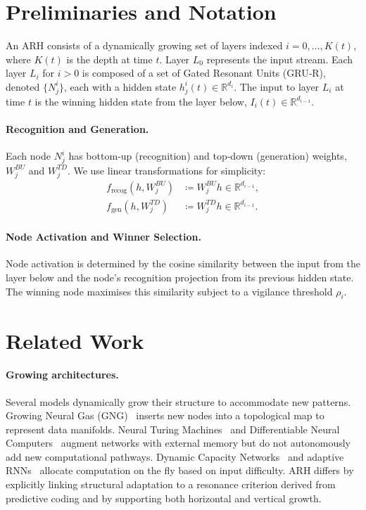 \documentclass{article}
\begin{document}
\section{Preliminaries and Notation}
An ARH consists of a dynamically growing set of layers indexed $i=0,\dots,K(t)$, where $K(t)$ is the depth at time $t$.  Layer $L_0$ represents the input stream.  Each layer $L_i$ for $i>0$ is composed of a set of Gated Resonant Units (GRU‑R), denoted $\{N_j^i\}$, each with a hidden state $h_j^i(t) \in \mathbb{R}^{d_i}$.  The input to layer $L_i$ at time $t$ is the winning hidden state from the layer below, $I_i(t) \in \mathbb{R}^{d_{i-1}}$.

\paragraph{Recognition and Generation.} Each node $N_j^i$ has bottom‑up (recognition) and top‑down (generation) weights, $W_j^{BU}$ and $W_j^{TD}$.  We use linear transformations for simplicity:
\begin{align}
f_{\text{recog}}(h, W_j^{BU}) &\coloneqq W_j^{BU} h \in \mathbb{R}^{d_{i-1}}, \\[-1ex]
f_{\text{gen}}(h, W_j^{TD}) &\coloneqq W_j^{TD} h \in \mathbb{R}^{d_{i-1}}.
\end{align}

\paragraph{Node Activation and Winner Selection.} Node activation is determined by the cosine similarity between the input from the layer below and the node's recognition projection from its previous hidden state.  The winning node maximises this similarity subject to a vigilance threshold $\rho_i$.

\section{Related Work}
\label{sec:related}

\paragraph{Growing architectures.}  Several models dynamically grow their structure to accommodate new patterns.  Growing Neural Gas (GNG) \citep{Fritzke1995} inserts new nodes into a topological map to represent data manifolds.  Neural Turing Machines \citep{Graves2014} and Differentiable Neural Computers \citep{Graves2016} augment networks with external memory but do not autonomously add new computational pathways.  Dynamic Capacity Networks \citep{Algebra2017} and adaptive RNNs \citep{Jernite2017} allocate computation on the fly based on input difficulty.  ARH differs by explicitly linking structural adaptation to a resonance criterion derived from predictive coding and by supporting both horizontal and vertical growth.
\end{document}
